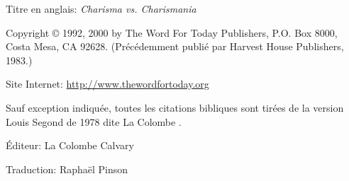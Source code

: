 \newpage
\mbox{}
\vfill
\noindent Titre en anglais\space: \emph{Charisma vs. Charismania}

\noindent Copyright \copyright{} 1992, 2000 by The Word For Today Publishers, P.O. Box 8000, \\
Costa Mesa, CA 92628. (Précédemment publié par Harvest House Publishers, 1983.) \\


\noindent Site Internet: \url{http://www.thewordfortoday.org}

\noindent Sauf exception indiquée, toutes les citations bibliques sont
 tirées de la version Louis Segond de 1978 dite \og La Colombe \fg{}.

\noindent Éditeur\space: La Colombe Calvary

\noindent Traduction\space: Raphaël Pinson

